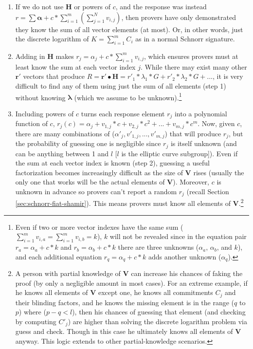 \begin{enumerate}
    \item If we do not use $\boldsymbol{H}$ or powers of $c$, and the response was instead $r = \sum \boldsymbol{\alpha} + c* \sum_{i=1}^{m} (\sum_{j=1}^{N} v_{i,j})$, then provers have only demonstrated they know the sum of all vector elements (at most). Or, in other words, just the discrete logarithm of $K = \sum_{i=1}^{m} C_i$ as in a normal Schnorr signature.

    \item Adding in $\boldsymbol{H}$ makes $r_j = \alpha_j +  c* \sum_{i=1}^{m} v_{i,j}$, which ensures provers must at least know the sum at each vector index $j$. While there may exist many other $\boldsymbol{r'}$ vectors that produce $R = \boldsymbol{r'} \bullet \boldsymbol{H} = r'_1*\lambda_1*G + r'_2*\lambda_2*G + ...$, it is very difficult to find any of them using just the sum of all elements (step 1) without knowing $\boldsymbol{\lambda}$ (which we assume to be unknown).\footnote{Even if two or more vector indexes have the same sum ($\sum_{i=1}^{m} v_{i,a} = \sum_{i=1}^{m} v_{i,b} = k$), $k$ will not be revealed since in the equation pair $r_a = \alpha_a + c*k$ and $r_b = \alpha_b + c*k$ there are three unknowns ($\alpha_a$, $\alpha_b$, and $k$), and each additional equation $r_q = \alpha_q + c*k$ adds another unknown ($\alpha_q$).}

    \item Including powers of $c$ turns each response element $r_j$ into a polynomial function of $c$, $r_j(c) = \alpha_j + v_{1,j}*c + v_{2,j}*c^2 + ... + v_{m,j}*c^m$. Now, given $c$, there are many combinations of ($\alpha'_j, v'_{1,j}, ..., v'_{m,j}$) that will produce $r_j$, but the probability of guessing one is negligible since $r_j$ is itself unknown (and can be anything between 1 and $l$ [$l$ is the elliptic curve subgroup]). Even if the sum at each vector index is known (step 2), guessing a useful factorization becomes increasingly difficult as the size of $\boldsymbol{V}$ rises (usually the only one that works will be the actual elements of $\boldsymbol{V}$). Moreover, $c$ is unknown in advance so provers can't report a random $r_j$ (recall Section \ref{sec:schnorr-fiat-shamir}). This means provers must know all elements of $\boldsymbol{V}$.\footnote{A person with partial knowledge of $\boldsymbol{V}$ can increase his chances of faking the proof (by only a negligible amount in most cases). For an extreme example, if he knows all elements of $\boldsymbol{V}$ except one, he knows all commitments $C_j$ and their blinding factors, and he knows the missing element is in the range ($q$ to $p$) where ($p - q < l$), then his chances of guessing that element (and checking by computing $C'_j$) are higher than solving the discrete logarithm problem via guess and check. Though in this case he ultimately knows all elements of $\boldsymbol{V}$ anyway. This logic extends to other partial-knowledge scenarios.}
\end{enumerate}


